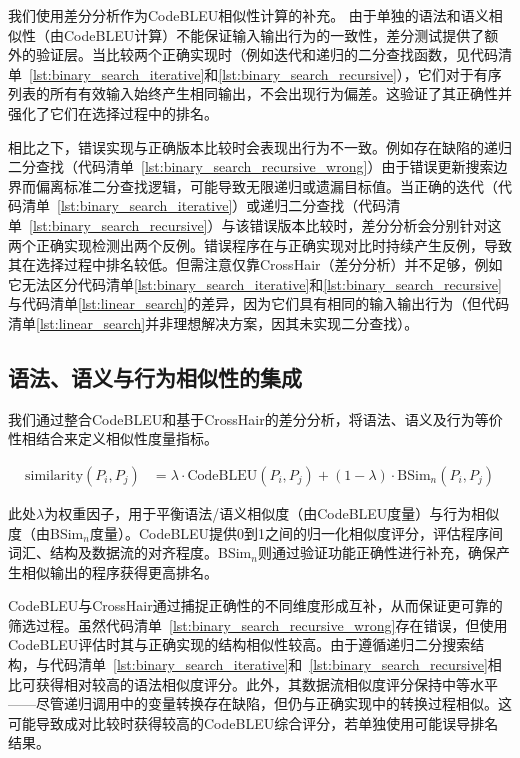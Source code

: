 \documentclass{article}
\begin{document}
我们使用差分分析作为CodeBLEU相似性计算的补充。
由于单独的语法和语义相似性（由CodeBLEU计算）不能保证输入输出行为的一致性，差分测试提供了额外的验证层。当比较两个正确实现时（例如迭代和递归的二分查找函数，见代码清单~\ref{lst:binary_search_iterative}和\ref{lst:binary_search_recursive}），它们对于有序列表的所有有效输入始终产生相同输出，不会出现行为偏差。这验证了其正确性并强化了它们在选择过程中的排名。

相比之下，错误实现与正确版本比较时会表现出行为不一致。例如存在缺陷的递归二分查找（代码清单~\ref{lst:binary_search_recursive_wrong}）由于错误更新搜索边界而偏离标准二分查找逻辑，可能导致无限递归或遗漏目标值。当正确的迭代（代码清单~\ref{lst:binary_search_iterative}）或递归二分查找（代码清单~\ref{lst:binary_search_recursive}）与该错误版本比较时，差分分析会分别针对这两个正确实现检测出两个反例。错误程序在与正确实现对比时持续产生反例，导致其在选择过程中排名较低。但需注意仅靠CrossHair（差分分析）并不足够，例如它无法区分代码清单\ref{lst:binary_search_iterative}和\ref{lst:binary_search_recursive}与代码清单\ref{lst:linear_search}的差异，因为它们具有相同的输入输出行为（但代码清单\ref{lst:linear_search}并非理想解决方案，因其未实现二分查找）。
\subsection{语法、语义与行为相似性的集成}

我们通过整合CodeBLEU和基于CrossHair的差分分析，将语法、语义及行为等价性相结合来定义相似性度量指标。

\begin{equation}
\label{eq:similarity}
\begin{split}
   \text{similarity}(P_i, P_j) &= \lambda \cdot \text{CodeBLEU}(P_i, P_j) + (1 - \lambda) \cdot \text{BSim}_n(P_i, P_j)
\end{split}
\end{equation}

\noindent 此处\( \lambda \)为权重因子，用于平衡语法/语义相似度（由CodeBLEU度量）与行为相似度（由BSim\(_n\)度量）。CodeBLEU提供0到1之间的归一化相似度评分，评估程序间词汇、结构及数据流的对齐程度。BSim\(_n\)则通过验证功能正确性进行补充，确保产生相似输出的程序获得更高排名。

CodeBLEU与CrossHair通过捕捉正确性的不同维度形成互补，从而保证更可靠的筛选过程。虽然代码清单~\ref{lst:binary_search_recursive_wrong}存在错误，但使用CodeBLEU评估时其与正确实现的结构相似性较高。由于遵循递归二分搜索结构，与代码清单~\ref{lst:binary_search_iterative}和~\ref{lst:binary_search_recursive}相比可获得相对较高的语法相似度评分。此外，其数据流相似度评分保持中等水平——尽管递归调用中的变量转换存在缺陷，但仍与正确实现中的转换过程相似。这可能导致成对比较时获得较高的CodeBLEU综合评分，若单独使用可能误导排名结果。
\end{document}
